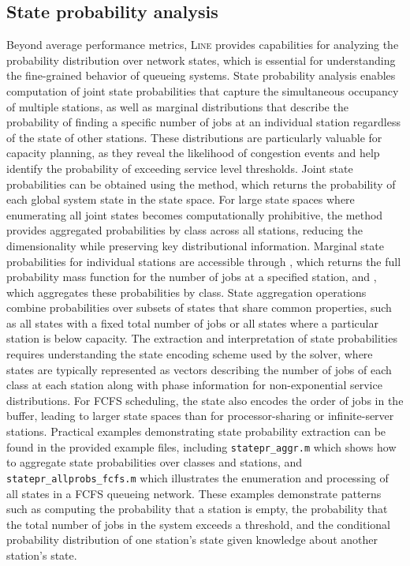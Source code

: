 \subsection{State probability analysis}
Beyond average performance metrics, \textsc{Line} provides capabilities for analyzing the probability distribution over network states, which is essential for understanding the fine-grained behavior of queueing systems. State probability analysis enables computation of joint state probabilities that capture the simultaneous occupancy of multiple stations, as well as marginal distributions that describe the probability of finding a specific number of jobs at an individual station regardless of the state of other stations. These distributions are particularly valuable for capacity planning, as they reveal the likelihood of congestion events and help identify the probability of exceeding service level thresholds. Joint state probabilities can be obtained using the  method, which returns the probability of each global system state in the state space. For large state spaces where enumerating all joint states becomes computationally prohibitive, the  method provides aggregated probabilities by class across all stations, reducing the dimensionality while preserving key distributional information. Marginal state probabilities for individual stations are accessible through , which returns the full probability mass function for the number of jobs at a specified station, and , which aggregates these probabilities by class. State aggregation operations combine probabilities over subsets of states that share common properties, such as all states with a fixed total number of jobs or all states where a particular station is below capacity. The extraction and interpretation of state probabilities requires understanding the state encoding scheme used by the solver, where states are typically represented as vectors describing the number of jobs of each class at each station along with phase information for non-exponential service distributions. For FCFS scheduling, the state also encodes the order of jobs in the buffer, leading to larger state spaces than for processor-sharing or infinite-server stations. Practical examples demonstrating state probability extraction can be found in the provided example files, including \texttt{statepr\_aggr.m} which shows how to aggregate state probabilities over classes and stations, and \texttt{statepr\_allprobs\_fcfs.m} which illustrates the enumeration and processing of all states in a FCFS queueing network. These examples demonstrate patterns such as computing the probability that a station is empty, the probability that the total number of jobs in the system exceeds a threshold, and the conditional probability distribution of one station's state given knowledge about another station's state.
